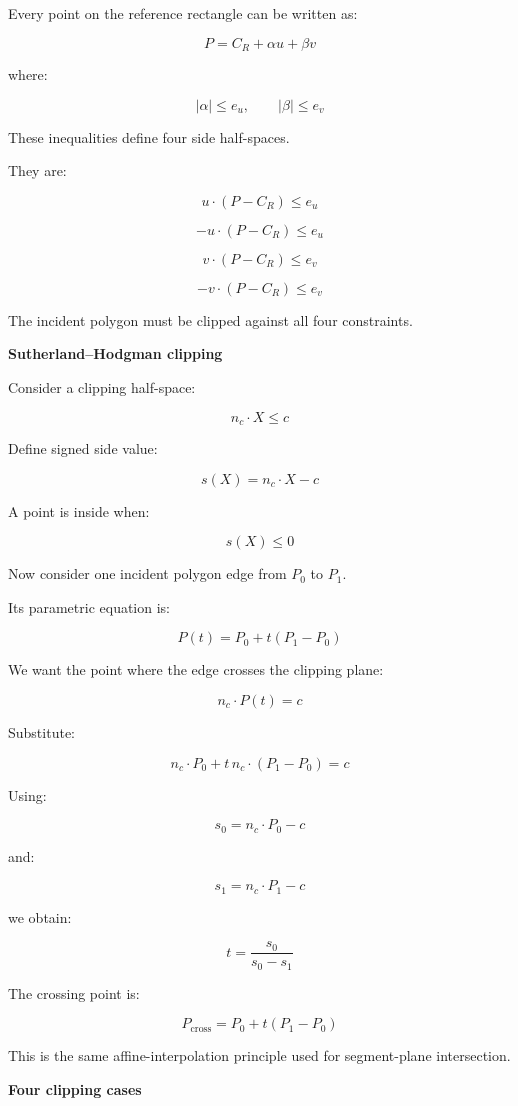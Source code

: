 Every point on the reference rectangle can be written as:

\[
\boxed{ P=C_R+\alpha u+\beta v }
\]

where:

\[
|\alpha|\le e_u,\qquad|\beta|\le e_v
\]

These inequalities define four side half-spaces.

They are:

\[
\boxed{ u\cdot(P-C_R)\le e_u }
\]

\[
\boxed{ -u\cdot(P-C_R)\le e_u }
\]

\[
\boxed{ v\cdot(P-C_R)\le e_v }
\]

\[
\boxed{ -v\cdot(P-C_R)\le e_v }
\]

The incident polygon must be clipped against all four constraints.

\textbf{Sutherland--Hodgman clipping}

Consider a clipping half-space:

\[
\boxed{ n_c\cdot X\le c }
\]

Define signed side value:

\[
s(X)=n_c\cdot X-c
\]

A point is inside when:

\[
s(X)\le0
\]

Now consider one incident polygon edge from \(P_0\) to \(P_1\).

Its parametric equation is:

\[
P(t)=P_0+t(P_1-P_0)
\]

We want the point where the edge crosses the clipping plane:

\[
n_c\cdot P(t)=c
\]

Substitute:

\[
n_c\cdot P_0+t\,n_c\cdot(P_1-P_0)=c
\]

Using:

\[
s_0=n_c\cdot P_0-c
\]

and:

\[
s_1=n_c\cdot P_1-c
\]

we obtain:

\[
\boxed{ t=\frac{s_0}{s_0-s_1} }
\]

The crossing point is:

\[
\boxed{ P_{\mathrm{cross}}= P_0+t(P_1-P_0) }
\]

This is the same affine-interpolation principle used for segment-plane intersection.

\textbf{Four clipping cases}


